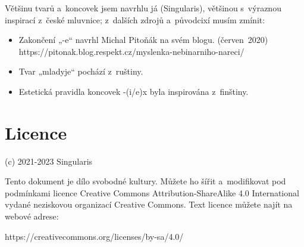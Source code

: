 Většinu tvarů a koncovek jsem navrhlu já (Singularis), většinou s výraznou
inspirací z české mluvnice; z dalších zdrojů a původcixí musím zmínit:

\begin{itemize}
\item Zakončení „-e“ navrhl Michal Pitoňák na svém blogu. (červen 2020)\\{}https://pitonak.blog.respekt.cz/myslenka-nebinarniho-nareci/
\item Tvar „mladyje“ pochází z ruštiny.
\item Estetická pravidla koncovek -(i/e)x byla inspirována z finštiny.
\end{itemize}

\section{Licence}

\noindent (c) 2021-2023 Singularis

Tento dokument je dílo svobodné kultury. Můžete ho šířit a modifikovat pod
podmínkami licence Creative Commons Attribution-ShareAlike 4.0 International
vydané neziskovou organizací Creative Commons. Text licence
můžete najít na webové adrese:

https://creativecommons.org/licenses/by-sa/4.0/


